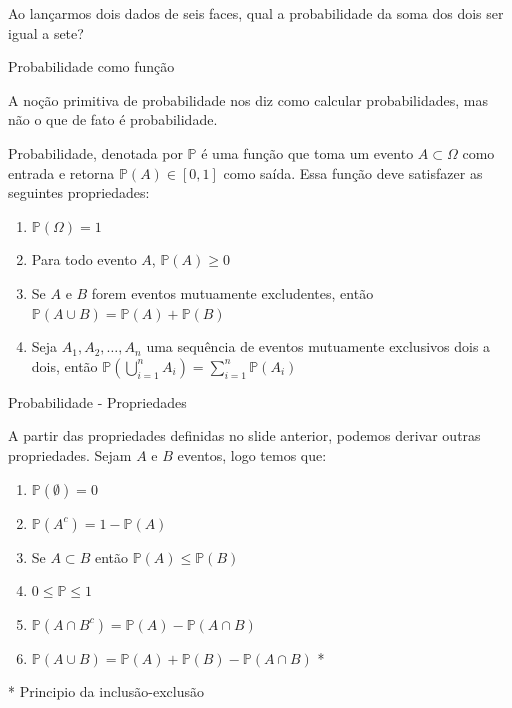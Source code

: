 \begin{frame}
    \begin{exemplo}
        Ao lançarmos dois dados de seis faces, qual a probabilidade da soma dos dois ser igual a sete?
            
        \end{exemplo}
\end{frame}

\begin{frame}{Probabilidade como função}

A noção primitiva de probabilidade nos diz como calcular probabilidades, mas não o que de fato é probabilidade. 

\begin{definicao}
    Probabilidade, denotada por $\mathds{P}$ é uma função que toma um evento $A \subset \Omega$ como entrada e retorna $\mathds{P}(A) \in [0,1]$ como saída. Essa função deve satisfazer as seguintes propriedades:

    \begin{enumerate}
        \item $\mathds{P}(\Omega) = 1$
        \item Para todo evento $A$, $\mathds{P}(A) \geq 0$
        \item Se $A$ e $B$ forem eventos mutuamente excludentes, então $\mathds{P}(A \cup B) = \mathds{P}(A) + \mathds{P}(B)$
        \item Seja $A_1, A_2, \dots, A_n$ uma sequência de eventos mutuamente exclusivos dois a dois, então $\mathds{P}(\bigcup_{i=1}^n A_i) = \sum_{i=1}^{n} \mathds{P}(A_i)$
    \end{enumerate}

\end{definicao}
    
\end{frame}

\begin{frame}{Probabilidade - Propriedades}

A partir das propriedades definidas no slide anterior, podemos derivar outras propriedades. Sejam $A$ e $B$  eventos, logo temos que:
\begin{enumerate}
    \item $\mathds{P}(\emptyset) = 0$
    \pause
    \item $\mathds{P}(A^c) = 1 - \mathds{P}(A)$
    \pause
    \item Se $A \subset B$ então $\mathds{P}(A) \leq \mathds{P}(B)$
    \pause
    \item $0 \leq \mathds{P} \leq 1$
    \pause
    \item $\mathds{P}(A \cap B^c) = \mathds{P}(A) - \mathds{P}(A \cap B)$
    \pause
    \item $\mathds{P}(A \cup B) = \mathds{P}(A) + \mathds{P}(B) - \mathds{P}(A \cap B)$ *
\end{enumerate}
    * Principio da inclusão-exclusão
\end{frame}

